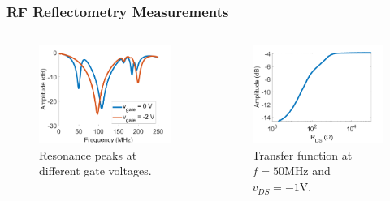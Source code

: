 \documentclass{beamer}
\begin{document}
\begin{frame}
    \frametitle{RF Reflectometry Measurements}

    \begin{columns}
        \begin{column}{0.5\textwidth}
            \begin{figure}
                \includegraphics[width = 1.1\textwidth]{matlab_cs0_resonance.png}
                \caption{Resonance peaks at different gate voltages.}
                \label{fig:cs0res}
            \end{figure}
        \end{column}
        \begin{column}{0.5\textwidth}
            \begin{figure}
                \includegraphics[width = 1.1\textwidth]{matlab_cs0_transfer.png}
                \caption{Transfer function at $f = 50\si{\mega\hertz}$ and $v_{DS} = -1\si{\volt}$.}
                \label{fig:cs0transfer}
            \end{figure}
        \end{column}
    \end{columns}
\end{frame}
\end{document}
